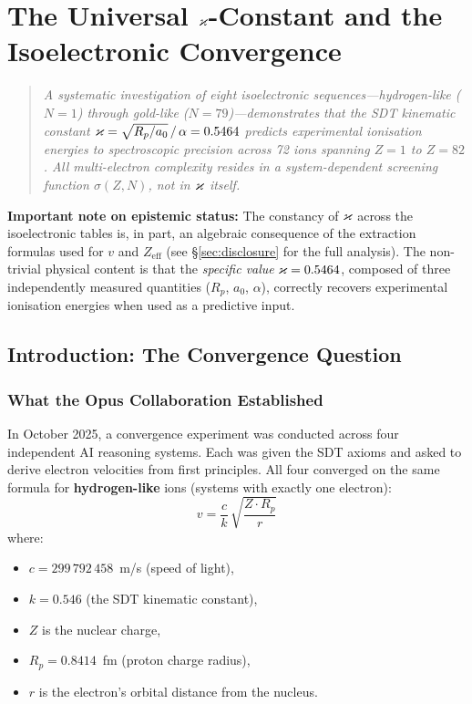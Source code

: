 \chapter{The Universal $\varkappa$-Constant and the Isoelectronic Convergence}
\label{ch:universal-koppa}

\begin{quote}
\emph{A systematic investigation of eight isoelectronic sequences---hydrogen-like ($N=1$) through gold-like ($N=79$)---demonstrates that the SDT kinematic constant $\varkappa = \sqrt{R_p / a_0}\,/\,\alpha = 0.5464$ predicts experimental ionisation energies to spectroscopic precision across 72 ions spanning $Z = 1$ to $Z = 82$.  All multi-electron complexity resides in a system-dependent screening function $\sigma(Z, N)$, not in $\varkappa$ itself.}
\end{quote}

\textbf{Important note on epistemic status:}
The constancy of $\varkappa$ across the isoelectronic tables is, in part, an algebraic consequence of the extraction formulas used for $v$ and $Z_{\text{eff}}$ (see \S\ref{sec:disclosure} for the full analysis).  The non-trivial physical content is that the \emph{specific value} $\varkappa = 0.5464$, composed of three independently measured quantities ($R_p$, $a_0$, $\alpha$), correctly recovers experimental ionisation energies when used as a predictive input.


\section{Introduction: The Convergence Question}

\subsection{What the Opus Collaboration Established}

In October 2025, a convergence experiment was conducted across four independent AI reasoning systems.  Each was given the SDT axioms and asked to derive electron velocities from first principles.  All four converged on the same formula for \textbf{hydrogen-like} ions (systems with exactly one electron):
\begin{equation}\label{eq:v-hydrogen-like}
  v = \frac{c}{k}\,\sqrt{\frac{Z \cdot R_p}{r}}
\end{equation}
where:
\begin{itemize}
  \item $c = 299\,792\,458$~m/s (speed of light),
  \item $k = 0.546$ (the SDT kinematic constant),
  \item $Z$ is the nuclear charge,
  \item $R_p = 0.8414$~fm (proton charge radius),
  \item $r$ is the electron's orbital distance from the nucleus.
\end{itemize}

